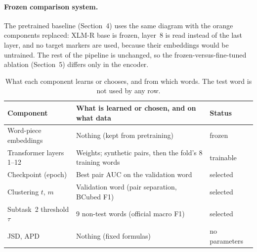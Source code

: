 \paragraph{Frozen comparison system.} The pretrained baseline (Section~4) uses
the same diagram with the orange components replaced: XLM-R base is frozen,
layer~8 is read instead of the last layer, and no target markers are used,
because their embeddings would be untrained. The rest of the pipeline is
unchanged, so the frozen-versus-fine-tuned ablation (Section~5) differs only in
the encoder.

\begin{table}[ht]
\centering
\small
\begin{tabularx}{\linewidth}{@{}lXl@{}}
\toprule
\textbf{Component} & \textbf{What is learned or chosen, and on what data} & \textbf{Status}\\
\midrule
Word-piece embeddings & Nothing (kept from pretraining) & frozen\\
Transformer layers 1--12 & Weights; synthetic pairs, then the fold's 8 training words & trainable\\
Checkpoint (epoch) & Best pair AUC on the validation word & selected\\
Clustering $t$, $m$ & Validation word (pair separation, BCubed F1) & selected\\
Subtask~2 threshold $\tau$ & 9 non-test words (official macro F1) & selected\\
JSD, APD & Nothing (fixed formulas) & no parameters\\
\bottomrule
\end{tabularx}
\caption{What each component learns or chooses, and from which words. The test word is not used by any row.}
\label{tab:architecture-status}
\end{table}
